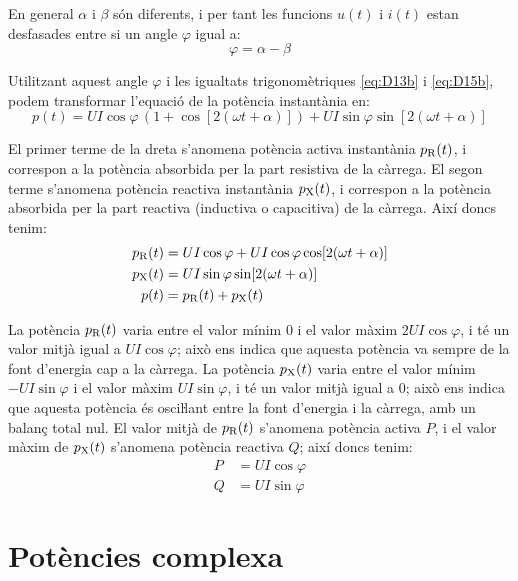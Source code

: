 En general $\alpha$ i $\beta$ són diferents, i per tant les funcions $u(t)$ i $i(t)$ estan desfasades entre si un angle $\varphi$ igual a:
\begin{equation}
  \varphi = \alpha - \beta
\end{equation}

Utilitzant aquest angle $\varphi$ i les igualtats trigonomètriques \eqref{eq:D13b} i \eqref{eq:D15b}, podem transformar l'equació de la potència instantània en:
\begin{equation}
   p(t) = U I \cos\varphi \,(1 + \cos [2 (\omega t + \alpha)]) + U I \sin\varphi \sin[2 (\omega t + \alpha)]
\end{equation}

El primer terme de la dreta  s'anomena potència activa instantània $p_\mathrm{R}(t)$, i correspon a la potència absorbida per la part resistiva de la càrrega. El segon terme  s'anomena potència reactiva instantània $p_\mathrm{X}(t)$, i correspon a la potència absorbida per la part reactiva (inductiva o capacitiva) de la càrrega. Així doncs tenim:
\begin{subequations}
\begin{align}
  p_\mathrm{R}(t) &=  U I \cos\varphi + U I \cos\varphi \cos [2 (\omega t + \alpha)] \\
  p_\mathrm{X}(t) &=  U I \sin\varphi \sin[2 (\omega t + \alpha)] \\
    p(t) &= p_\mathrm{R}(t) + p_\mathrm{X}(t)
\end{align}
\end{subequations}
	
La potència $p_\mathrm{R}(t)$ varia entre el valor mínim 0 i el valor màxim $2 U I \cos\varphi$, i té un valor mitjà igual a $U I \cos\varphi$; això ens indica que aquesta potència va sempre de la font d'energia cap a la càrrega. La potència $p_\mathrm{X}(t)$ varia entre el valor mínim $-U I \sin\varphi$ i el valor  màxim $U I \sin\varphi$, i té un valor mitjà igual a 0; això ens indica que aquesta potència és osciŀlant entre la font d'energia i la càrrega, amb un balanç total nul. El valor mitjà de $p_\mathrm{R}(t)$ s'anomena potència activa $P$, i el valor màxim de $p_\mathrm{X}(t)$ s'anomena potència reactiva $Q$; així doncs tenim:
\begin{align}
  P &= U I \cos\varphi \\
  Q &= U I \sin\varphi
\end{align}

\section{Potències  complexa}\label{sec:pot_complex} 

